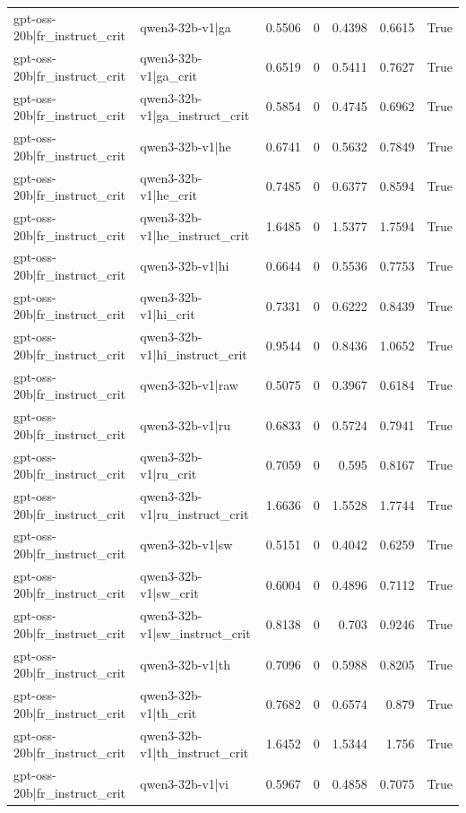 \begin{table}
\begin{tabular}{l l r r r r l}
gpt-oss-20b|fr_instruct_crit & qwen3-32b-v1|ga & 0.5506 & 0 & 0.4398 & 0.6615 & True \\
gpt-oss-20b|fr_instruct_crit & qwen3-32b-v1|ga_crit & 0.6519 & 0 & 0.5411 & 0.7627 & True \\
gpt-oss-20b|fr_instruct_crit & qwen3-32b-v1|ga_instruct_crit & 0.5854 & 0 & 0.4745 & 0.6962 & True \\
gpt-oss-20b|fr_instruct_crit & qwen3-32b-v1|he & 0.6741 & 0 & 0.5632 & 0.7849 & True \\
gpt-oss-20b|fr_instruct_crit & qwen3-32b-v1|he_crit & 0.7485 & 0 & 0.6377 & 0.8594 & True \\
gpt-oss-20b|fr_instruct_crit & qwen3-32b-v1|he_instruct_crit & 1.6485 & 0 & 1.5377 & 1.7594 & True \\
gpt-oss-20b|fr_instruct_crit & qwen3-32b-v1|hi & 0.6644 & 0 & 0.5536 & 0.7753 & True \\
gpt-oss-20b|fr_instruct_crit & qwen3-32b-v1|hi_crit & 0.7331 & 0 & 0.6222 & 0.8439 & True \\
gpt-oss-20b|fr_instruct_crit & qwen3-32b-v1|hi_instruct_crit & 0.9544 & 0 & 0.8436 & 1.0652 & True \\
gpt-oss-20b|fr_instruct_crit & qwen3-32b-v1|raw & 0.5075 & 0 & 0.3967 & 0.6184 & True \\
gpt-oss-20b|fr_instruct_crit & qwen3-32b-v1|ru & 0.6833 & 0 & 0.5724 & 0.7941 & True \\
gpt-oss-20b|fr_instruct_crit & qwen3-32b-v1|ru_crit & 0.7059 & 0 & 0.595 & 0.8167 & True \\
gpt-oss-20b|fr_instruct_crit & qwen3-32b-v1|ru_instruct_crit & 1.6636 & 0 & 1.5528 & 1.7744 & True \\
gpt-oss-20b|fr_instruct_crit & qwen3-32b-v1|sw & 0.5151 & 0 & 0.4042 & 0.6259 & True \\
gpt-oss-20b|fr_instruct_crit & qwen3-32b-v1|sw_crit & 0.6004 & 0 & 0.4896 & 0.7112 & True \\
gpt-oss-20b|fr_instruct_crit & qwen3-32b-v1|sw_instruct_crit & 0.8138 & 0 & 0.703 & 0.9246 & True \\
gpt-oss-20b|fr_instruct_crit & qwen3-32b-v1|th & 0.7096 & 0 & 0.5988 & 0.8205 & True \\
gpt-oss-20b|fr_instruct_crit & qwen3-32b-v1|th_crit & 0.7682 & 0 & 0.6574 & 0.879 & True \\
gpt-oss-20b|fr_instruct_crit & qwen3-32b-v1|th_instruct_crit & 1.6452 & 0 & 1.5344 & 1.756 & True \\
gpt-oss-20b|fr_instruct_crit & qwen3-32b-v1|vi & 0.5967 & 0 & 0.4858 & 0.7075 & True \\

\end{tabular}
\end{table}
